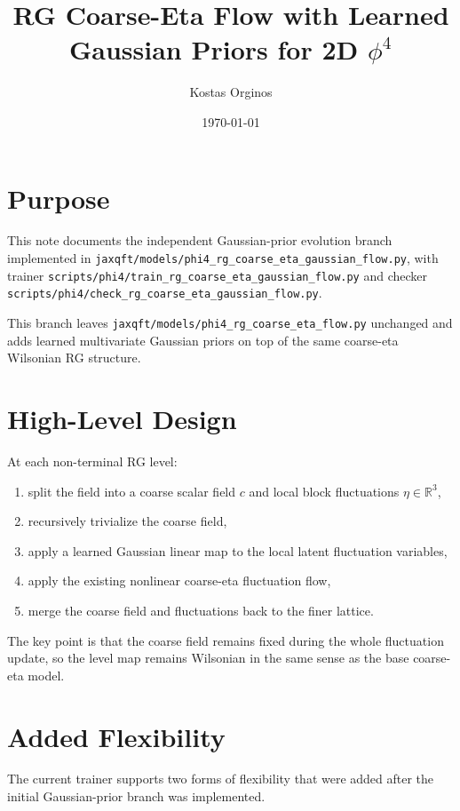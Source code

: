 \documentclass[11pt]{article}
\title{RG Coarse-Eta Flow with Learned Gaussian Priors for 2D $\phi^4$}
\author{Kostas Orginos}
\date{\today}
\begin{document}
\maketitle

\section{Purpose}

This note documents the independent Gaussian-prior evolution branch implemented
in
\texttt{jaxqft/models/phi4\_rg\_coarse\_eta\_gaussian\_flow.py},
with trainer
\texttt{scripts/phi4/train\_rg\_coarse\_eta\_gaussian\_flow.py}
and checker
\texttt{scripts/phi4/check\_rg\_coarse\_eta\_gaussian\_flow.py}.

This branch leaves
\texttt{jaxqft/models/phi4\_rg\_coarse\_eta\_flow.py}
unchanged and adds learned multivariate Gaussian priors on top of the same
coarse-eta Wilsonian RG structure.

\section{High-Level Design}

At each non-terminal RG level:
\begin{enumerate}
\item split the field into a coarse scalar field $c$ and local block
fluctuations $\eta \in \mathbb{R}^3$,
\item recursively trivialize the coarse field,
\item apply a learned Gaussian linear map to the local latent fluctuation
variables,
\item apply the existing nonlinear coarse-eta fluctuation flow,
\item merge the coarse field and fluctuations back to the finer lattice.
\end{enumerate}

The key point is that the coarse field remains fixed during the whole
fluctuation update, so the level map remains Wilsonian in the same sense as the
base coarse-eta model.

\section{Added Flexibility}

The current trainer supports two forms of flexibility that were added after the
initial Gaussian-prior branch was implemented.
\end{document}
